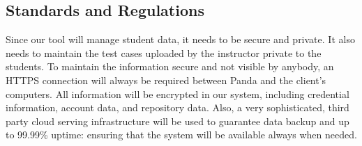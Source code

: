 \subsection{Standards and Regulations}

Since our tool will manage student data, it needs to be secure and private. It
also needs to maintain the test cases uploaded by the instructor private to the
students. To maintain the information secure and not visible by anybody, an
HTTPS connection will always be required between Panda and the client's
computers. All information will be encrypted in our system, including credential
information, account data, and repository data. Also, a very sophisticated,
third party cloud serving infrastructure will be used to guarantee data backup
and up to 99.99\% uptime: ensuring that the system will be available always when
needed.
